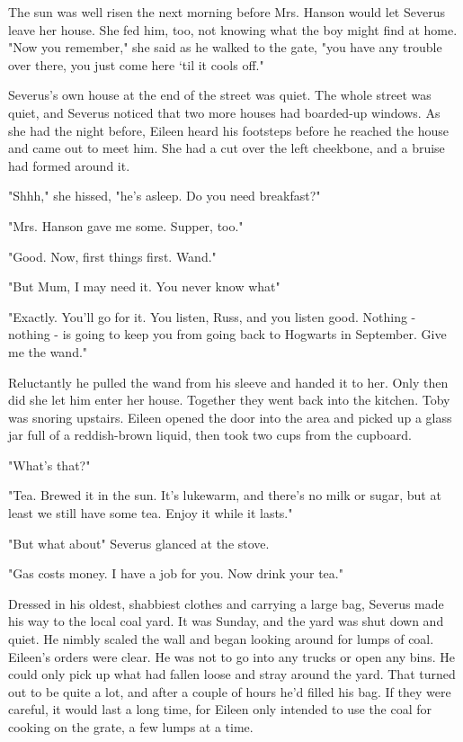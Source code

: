 The sun was well risen the next morning before Mrs. Hanson would let Severus leave her house. She fed him, too, not knowing what the boy might find at home. "Now you remember," she said as he walked to the gate, "you have any trouble over there, you just come here `til it cools off."

Severus's own house at the end of the street was quiet. The whole street was quiet, and Severus noticed that two more houses had boarded-up windows. As she had the night before, Eileen heard his footsteps before he reached the house and came out to meet him. She had a cut over the left cheekbone, and a bruise had formed around it.

"Shhh," she hissed, "he's asleep. Do you need breakfast?"

"Mrs. Hanson gave me some. Supper, too."

"Good. Now, first things first. Wand."

"But Mum, I may need it. You never know what{\el}"

"Exactly. You'll go for it. You listen, Russ, and you listen good. Nothing - nothing - is going to keep you from going back to Hogwarts in September. Give me the wand."

Reluctantly he pulled the wand from his sleeve and handed it to her. Only then did she let him enter her house. Together they went back into the kitchen. Toby was snoring upstairs. Eileen opened the door into the area and picked up a glass jar full of a reddish-brown liquid, then took two cups from the cupboard.

"What's that?"

"Tea. Brewed it in the sun. It's lukewarm, and there's no milk or sugar, but at least we still have some tea. Enjoy it while it lasts."

"But what about{\el}" Severus glanced at the stove.

"Gas costs money. I have a job for you. Now drink your tea."

Dressed in his oldest, shabbiest clothes and carrying a large bag, Severus made his way to the local coal yard. It was Sunday, and the yard was shut down and quiet. He nimbly scaled the wall and began looking around for lumps of coal. Eileen's orders were clear. He was not to go into any trucks or open any bins. He could only pick up what had fallen loose and stray around the yard. That turned out to be quite a lot, and after a couple of hours he'd filled his bag. If they were careful, it would last a long time, for Eileen only intended to use the coal for cooking on the grate, a few lumps at a time.

